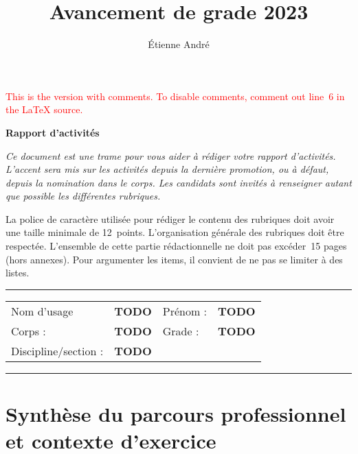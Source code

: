 \documentclass[a4paper,12pt]{article}
\title{Avancement de grade 2023}
\author{Étienne André}
\newcommand{\instructions}[1]{{\color{black}#1}}
\begin{document}
\ifdefined\VersionWithComments

	\textcolor{red}{This is the version with comments.
	To disable comments, comment out line~6 in the \LaTeX{} source.}
	
	\medskip
	
\fi

{
	\Large\bfseries
	\noindent{}Rapport d'activités
}

\bigskip

\instructions{
\em
Ce document est une trame pour vous aider à rédiger votre rapport d'activités. L'accent sera mis sur les activités depuis la dernière promotion, ou à défaut, depuis la nomination dans le corps. Les candidats sont invités à renseigner autant que possible les différentes rubriques.

\bigskip

La police de caractère utilisée pour rédiger le contenu des rubriques doit avoir une taille minimale de 12~points. L'organisation générale des rubriques doit être respectée. L'ensemble de cette partie rédactionnelle ne doit pas excéder~15 pages (hors annexes). Pour argumenter les items, il convient de ne pas se limiter à des listes.

\bigskip
}

\noindent\rule{\textwidth}{2pt}

\medskip

{\em
\def\arraystretch{2}
\noindent{}\begin{tabular}{l l @{\hspace{3em}} l l}
	Nom d'usage & \textbf{TODO} & Prénom : & \textbf{TODO} \\
	Corps : & \textbf{TODO} & Grade : & \textbf{TODO} \\
	Discipline/section : & \textbf{TODO} \\
\end{tabular}
}

\medskip

\noindent\rule{\textwidth}{2pt}


\section{Synthèse du parcours professionnel et contexte d'exercice}
\end{document}
